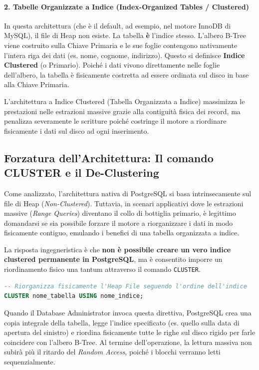 \paragraph{2. Tabelle Organizzate a Indice (Index-Organized Tables / Clustered)}
In questa architettura (che è il default, ad esempio, nel motore InnoDB di MySQL), il file di Heap non esiste. La tabella \textbf{è} l'indice stesso. L'albero B-Tree viene costruito sulla Chiave Primaria e le sue foglie contengono nativamente l'intera riga dei dati (es. nome, cognome, indirizzo). Questo si definisce \textbf{Indice Clustered} (o Primario).
Poiché i dati vivono direttamente nelle foglie dell'albero, la tabella è fisicamente costretta ad essere ordinata sul disco in base alla Chiave Primaria.

\begin{tip}
    L'architettura a Indice Clustered (Tabella Organizzata a Indice) massimizza le prestazioni nelle estrazioni massive grazie alla contiguità fisica dei record, ma penalizza severamente le scritture poiché costringe il motore a riordinare fisicamente i dati sul disco ad ogni inserimento.
\end{tip}

\subsection{Forzatura dell'Architettura: Il comando CLUSTER e il De-Clustering}

Come analizzato, l'architettura nativa di PostgreSQL si basa intrinsecamente sul file di Heap (\textit{Non-Clustered}). Tuttavia, in scenari applicativi dove le estrazioni massive (\textit{Range Queries}) diventano il collo di bottiglia primario, è legittimo domandarsi se sia possibile forzare il motore a riorganizzare i dati in modo fisicamente contiguo, emulando i benefici di una tabella organizzata a indice.

La risposta ingegneristica è che \textbf{non è possibile creare un vero indice clustered permanente in PostgreSQL}, ma è consentito imporre un riordinamento fisico una tantum attraverso il comando \texttt{CLUSTER}.

\begin{lstlisting}[language=SQL, basicstyle=\ttfamily\small, keywordstyle=\color{blue}\bfseries]
-- Riorganizza fisicamente l'Heap File seguendo l'ordine dell'indice
CLUSTER nome_tabella USING nome_indice;
\end{lstlisting}

Quando il Database Administrator invoca questa direttiva, PostgreSQL crea una copia integrale della tabella, legge l'indice specificato (es. quello sulla data di apertura del sinistro) e riordina fisicamente tutte le righe sul disco rigido per farle coincidere con l'albero B-Tree. Al termine dell'operazione, la lettura massiva non subirà più il ritardo del \textit{Random Access}, poiché i blocchi verranno letti sequenzialmente.

